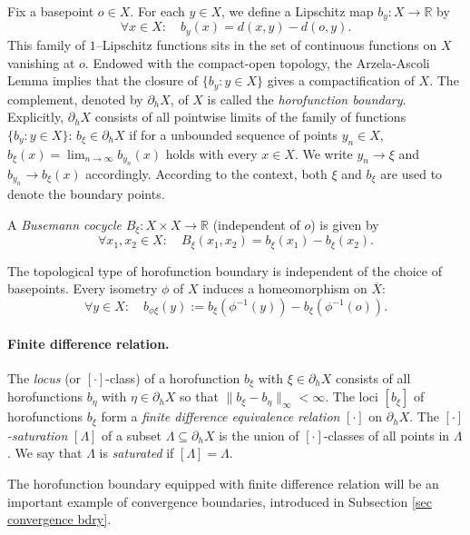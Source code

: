 \documentclass{amsart}
\theoremstyle{definition}
\theoremstyle{remark}
\newcommand{\U}{ X}
\newcommand{\bU}{\overline{  X}}
\newcommand{\hU}{\partial_h{  X}}
\begin{document}
 
Fix a basepoint $o\in \U$. For  each $y \in  \U$, we define a Lipschitz map $b_y:  \U\to \mathbb R$     by $$\forall x\in \U:\quad b_y(x)=d(x, y)-d(o,y).$$ This   family of $1$--Lipschitz functions sits in the set of continuous functions on $ \U$ vanishing at $o$.  Endowed  with the compact-open topology, the  Arzela-Ascoli Lemma implies that the closure  of $\{b_y: y\in  \U\}$  gives a compactification of $ \U$.  The complement, denoted by $\hU$, of $ \U$ is called  the \textit{horofunction boundary}. Explicitly,  $\hU$ consists of all pointwise limits of the family of functions $\{b_y: y\in  \U\}$: $b_\xi\in \hU$ if for a unbounded sequence of points $y_n\in X$, $b_\xi(x)=\lim_{n\to \infty} b_{y_n}(x)$ holds with every $x\in X$. We write $y_n\to \xi$ and $b_{y_n}\to b_\xi(x)$ accordingly. According to the context, both $\xi$ and $b_\xi$ are used to denote  the boundary points. 

A \textit{Busemann cocycle} $B_\xi:  \U\times \U \to \mathbb R$ (independent of $o$) is given by $$\forall x_1, x_2\in  \U: \quad B_\xi(x_1, x_2)=b_\xi(x_1)-b_\xi(x_2).$$
  
The topological type of horofunction boundary is independent of  the choice of   basepoints. Every isometry $\phi$ of $\U$ induces a homeomorphism on $\bU$:  
$$
\forall y\in \U:\quad b_{\phi\xi}(y):=b_\xi(\phi^{-1}(y))-b_\xi(\phi^{-1}(o)).
$$

\paragraph{\textbf{Finite difference relation}.}
The   \textit{locus} (or $[\cdot]$-class) of   a horofunction  $b_\xi$ with $\xi\in \hU$ consists of all horofunctions $b_\eta$ with $\eta\in \hU$ so that $\|b_\xi-b_\eta\|_\infty<\infty.$  The loci   $[b_\xi]$  of    horofunctions $b_\xi$ form a \textit{finite difference equivalence relation} $[\cdot]$ on $\hU$. The \textit{ $[\cdot]$-saturation} $[\Lambda]$ of a subset $\Lambda\subseteq \hU$ is the union of  $[\cdot]$-classes of all points in $\Lambda$. We say that $\Lambda$ is \textit{saturated} if $[\Lambda]=\Lambda$. 

The horofunction boundary equipped with finite difference relation will be an important example of convergence boundaries, introduced in Subsection \ref{sec convergence bdry}.\newline  

\end{document}
